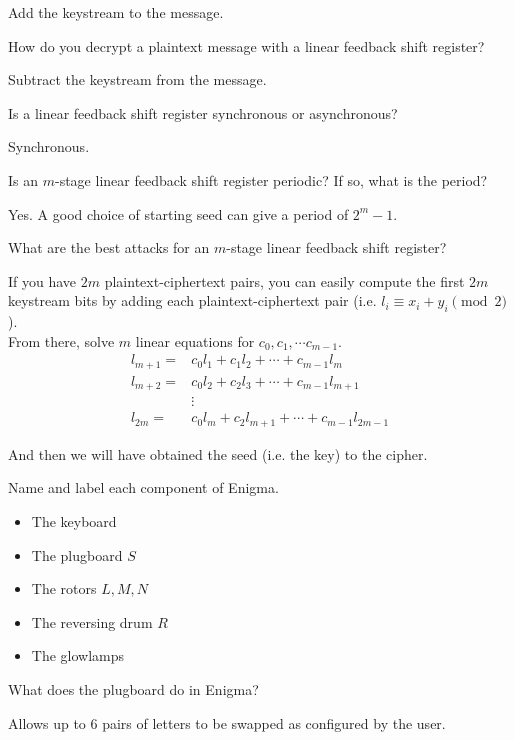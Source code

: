 \documentclass{article}
\newcounter{qcounter}
\newcommand{\showqcounter}{\theqcounter}
\newcommand{\question}{\vspace{5mm}\addtocounter{qcounter}{1}\vspace{5mm}{\bf Q\showqcounter: }}
\newcommand{\answer}{\vspace{5mm}{\bf A\showqcounter: }}
\begin{document}
\answer Add the keystream to the message.


\question How do you decrypt a plaintext message with a linear feedback shift register?

\answer Subtract the keystream from the message.


\question Is a linear feedback shift register synchronous or asynchronous?

\answer Synchronous.


\question Is an $m$-stage linear feedback shift register periodic? If so, what is the period?

\answer Yes. A good choice of starting seed can give a period of $2^m - 1$.


\question What are the best attacks for an $m$-stage linear feedback shift register?

\answer If you have $2m$ plaintext-ciphertext pairs, you can easily compute the first $2m$ keystream 
  bits by adding each plaintext-ciphertext pair (i.e. $l_i \equiv x_i + y_i \pmod{2}$).\\

  From there, solve $m$ linear equations for $c_0, c_1, \cdots c_{m-1}$.
  \begin{align*}
    l_{m + 1} =& c_0 l_1 + c_1 l_2 + \cdots + c_{m - 1} l_m \\
    l_{m + 2} =& c_0 l_2 + c_2 l_3 + \cdots + c_{m - 1} l_{m + 1}\\
              &\vdots\\
    l_{2m}    =& c_0 l_m + c_2 l_{m + 1} + \cdots + c_{m - 1} l_{2m - 1}
  \end{align*}

  And then we will have obtained the seed (i.e. the key) to the cipher.


\question Name and label each component of Enigma.

\answer
  \begin{itemize}
    \item The keyboard
    \item The plugboard $S$
    \item The rotors $L, M, N$
    \item The reversing drum $R$
    \item The glowlamps
  \end{itemize}


\question What does the plugboard do in Enigma?

\answer Allows up to $6$ pairs of letters to be swapped as configured by the user. 
\end{document}
